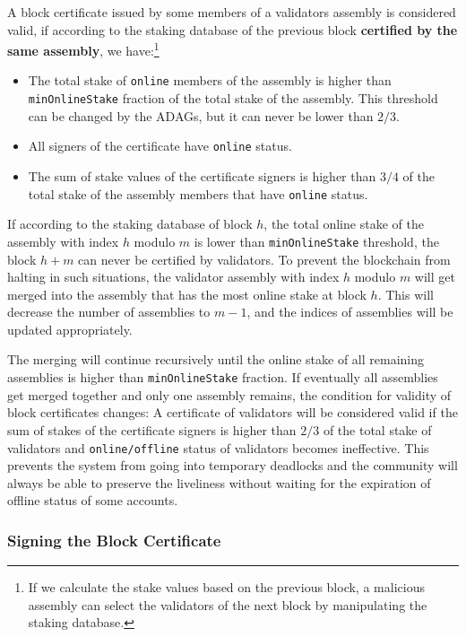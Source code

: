 A block certificate issued by some members of a validators assembly is considered valid, if according to
the staking database of the previous block \textbf{certified by the same assembly}, we have:\footnote{If we calculate
the stake values based on the previous block, a malicious assembly can select the validators of the next block by
manipulating the staking database.}
\begin{itemize}
    \item The total stake of \texttt{online} members of the assembly is higher than \texttt{minOnlineStake} fraction
    of the total stake of the assembly. This threshold can be changed by the ADAGs, but it can never be lower
    than $2/3$.
    \item All signers of the certificate have \texttt{online} status.
    \item The sum of stake values of the certificate signers is higher than $3/4$ of the total stake
    of the assembly members that have \texttt{online} status.
\end{itemize}

If according to the staking database of block $h$, the total online stake of the assembly with index $h$ modulo $m$ is
lower than \texttt{minOnlineStake} threshold, the block $h + m$ can never be certified by validators. To prevent the
blockchain from halting in such situations, the validator assembly with index $h$ modulo $m$ will get merged into the
assembly that has the most online stake at block $h$. This will decrease the number of assemblies to $m-1$, and the
indices of assemblies will be updated appropriately.

The merging will continue recursively until the online stake of all remaining assemblies is higher than
\texttt{minOnlineStake} fraction.
If eventually all assemblies get merged together and only one assembly remains, the condition
for validity of block certificates changes: A certificate of validators will be considered valid if the sum of stakes
of the certificate signers is higher than $2/3$ of the total stake of validators and \texttt{online/offline}
status of validators becomes ineffective. This prevents the system from going into temporary deadlocks and the
community will always be able to preserve the liveliness without waiting for the expiration of offline status of
some accounts.

\subsubsection{Signing the Block Certificate}

